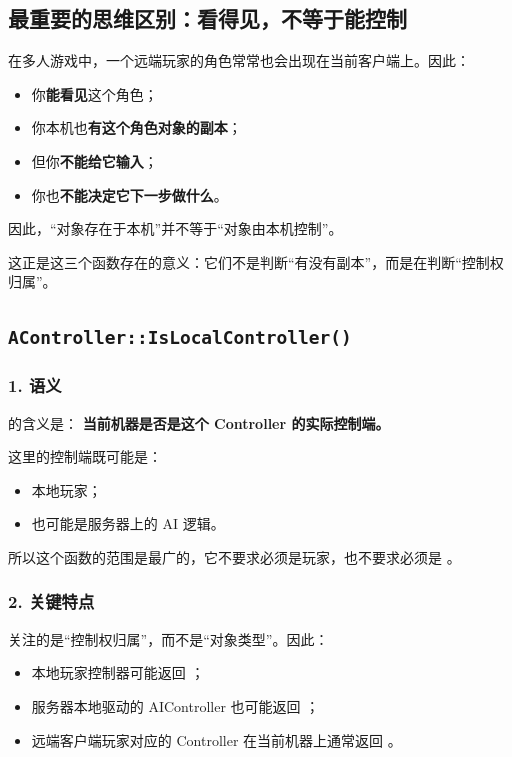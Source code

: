 \subsection{最重要的思维区别：看得见，不等于能控制}

在多人游戏中，一个远端玩家的角色常常也会出现在当前客户端上。因此：

\begin{itemize}
	\item 你\textbf{能看见}这个角色；
	\item 你本机也\textbf{有这个角色对象的副本}；
	\item 但你\textbf{不能给它输入}；
	\item 你也\textbf{不能决定它下一步做什么}。
\end{itemize}

因此，“对象存在于本机”并不等于“对象由本机控制”。

这正是这三个函数存在的意义：它们不是判断“有没有副本”，而是在判断“控制权归属”。

\subsection{\texttt{AController::IsLocalController()}}

\subsubsection*{1. 语义}

 的含义是：
\textbf{当前机器是否是这个 Controller 的实际控制端。}

这里的控制端既可能是：
\begin{itemize}
	\item 本地玩家；
	\item 也可能是服务器上的 AI 逻辑。
\end{itemize}

所以这个函数的范围是最广的，它不要求必须是玩家，也不要求必须是 。

\subsubsection*{2. 关键特点}

 关注的是“控制权归属”，而不是“对象类型”。因此：

\begin{itemize}
	\item 本地玩家控制器可能返回 ；
	\item 服务器本地驱动的 AIController 也可能返回 ；
	\item 远端客户端玩家对应的 Controller 在当前机器上通常返回 。
\end{itemize}

